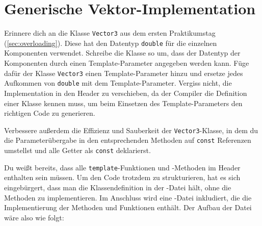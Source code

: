 \section{\ExercisePrefixAdvanced Generische Vektor-Implementation}
Erinnere dich an die Klasse \lstinline{Vector3} aus dem ersten Praktikumstag (\ref{sec:overloading}).
Diese hat den Datentyp \lstinline{double} für die einzelnen Komponenten verwendet.
Schreibe die Klasse so um, dass der Datentyp der Komponenten durch einen Template-Parameter angegeben werden kann.
Füge dafür der Klasse \lstinline{Vector3} einen Template-Parameter hinzu und ersetze jedes Aufkommen von \lstinline{double} mit dem Template-Parameter.
Vergiss nicht, die Implementation in den Header zu verschieben, da der Compiler die Definition einer Klasse kennen muss, um beim Einsetzen des Template-Parameters den richtigen Code zu generieren.

Verbessere außerdem die Effizienz und Sauberkeit der \lstinline{Vector3}-Klasse, in dem du die Parameterübergabe in den entsprechenden Methoden auf \lstinline{const} Referenzen umstellst und alle Getter als \lstinline{const} deklarierst.

Du weißt bereits, dass alle \lstinline{template}-Funktionen und -Methoden im Header enthalten sein müssen.
Um den Code trotzdem zu strukturieren, hat es sich eingebürgert, dass man die Klassendefinition in der -Datei hält, ohne die Methoden zu implementieren.
Im Anschluss wird eine -Datei inkludiert, die die Implementierung der Methoden und Funktionen enthält.
%
Der Aufbau der Datei  wäre also wie folgt:


